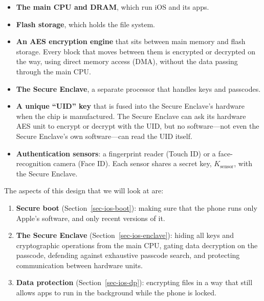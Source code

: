 \documentclass[
  letterpaper,
]{scrbook}
\providecommand{\tightlist}{%
  \setlength{\itemsep}{0pt}\setlength{\parskip}{0pt}}
\theoremstyle{definition}
\theoremstyle{plain}
\theoremstyle{plain}
\theoremstyle{remark}
\begin{document}
\begin{itemize}
\item
  \textbf{The main CPU and DRAM}, which run iOS and its apps.
\item
  \textbf{Flash storage}, which holds the file system.
\item
  \textbf{An AES encryption engine} that sits between main memory and
  flash storage. Every block that moves between them is encrypted or
  decrypted on the way, using direct memory access (DMA), without the
  data passing through the main CPU.
\item
  \textbf{The Secure Enclave}, a separate processor that handles keys
  and passcodes.
\item
  \textbf{A unique ``UID'' key} that is fused into the Secure Enclave's
  hardware when the chip is manufactured. The Secure Enclave can ask its
  hardware AES unit to encrypt or decrypt with the UID, but no
  software---not even the Secure Enclave's own software---can read the
  UID itself.

\item
  \textbf{Authentication sensors}: a fingerprint reader (Touch ID) or a
  face-recognition camera (Face ID). Each sensor shares a secret key,
  \(K_\text{sensor}\), with the Secure Enclave.
\end{itemize}

The aspects of this design that we will look at are:

\begin{enumerate}
\def\labelenumi{\arabic{enumi}.}
\tightlist
\item
  \textbf{Secure boot} (Section~\ref{sec-ios-boot}): making sure that
  the phone runs only Apple's software, and only recent versions of it.
\item
  \textbf{The Secure Enclave} (Section~\ref{sec-ios-enclave}): hiding
  all keys and cryptographic operations from the main CPU, gating data
  decryption on the passcode, defending against exhaustive passcode
  search, and protecting communication between hardware units.
\item
  \textbf{Data protection} (Section~\ref{sec-ios-dp}): encrypting files
  in a way that still allows apps to run in the background while the
  phone is locked.
\end{enumerate}
\end{document}
